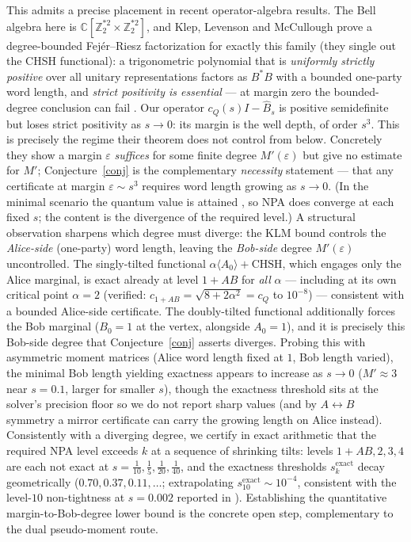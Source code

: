 \documentclass[11pt]{article}
\begin{document}
This admits a precise placement in recent operator-algebra results. The Bell
algebra here is $\mathbb C[\mathbb Z_2^{*2}\times\mathbb Z_2^{*2}]$, and
Klep, Levenson and McCullough \cite{KLM} prove a degree-bounded
Fej\'er--Riesz factorization for exactly this family (they single out the CHSH
functional): a trigonometric polynomial that is \emph{uniformly strictly
positive} over all unitary representations factors as $B^*B$ with a bounded
one-party word length, and \emph{strict positivity is essential} --- at margin
zero the bounded-degree conclusion can fail \cite{KLM,FKMPRSZ}. Our operator $c_Q(s)I-\widehat B_s$ is positive semidefinite
but loses strict positivity as $s\to0$: its margin is the well depth, of order
$s^3$. This is precisely the regime their theorem does not control from below.
Concretely they show a margin $\varepsilon$ \emph{suffices} for some finite
degree $M'(\varepsilon)$ but give no estimate for $M'$; Conjecture~\ref{conj} is
the complementary \emph{necessity} statement --- that any certificate at margin
$\varepsilon\sim s^3$ requires word length growing as $s\to0$. (In the minimal
scenario the quantum value is attained \cite{BB}, so
NPA does converge at each fixed $s$; the content is the divergence of the
required level.) A structural observation sharpens which degree must diverge:
the KLM bound controls the \emph{Alice-side} (one-party) word length, leaving the
\emph{Bob-side} degree $M'(\varepsilon)$ uncontrolled. The singly-tilted
functional $\alpha\langle A_0\rangle+\mathrm{CHSH}$, which engages only the Alice
marginal, is exact already at level $1{+}AB$ for \emph{all} $\alpha$ --- including
at its own critical point $\alpha=2$ (verified: $c_{1+AB}=\sqrt{8+2\alpha^2}=c_Q$
to $10^{-8}$) --- consistent with a bounded Alice-side certificate. The
doubly-tilted functional additionally forces the Bob marginal ($B_0=1$ at the
vertex, alongside $A_0=1$), and it is precisely this Bob-side degree that
Conjecture~\ref{conj} asserts diverges. Probing this with asymmetric moment
matrices (Alice word length fixed at $1$, Bob length varied), the minimal Bob
length yielding exactness appears to increase as $s\to0$ ($M'\approx3$ near
$s=0.1$, larger for smaller $s$), though the exactness threshold sits at the
solver's precision floor so we do not report sharp values (and by
$A\!\leftrightarrow\!B$ symmetry a mirror certificate can carry the growing length
on Alice instead). Consistently with a diverging degree, we
certify in exact arithmetic that the required NPA level exceeds $k$ at a sequence
of shrinking tilts: levels $1{+}AB,2,3,4$ are each not exact at
$s=\tfrac1{10},\tfrac15,\tfrac1{20},\tfrac1{40}$, and the exactness thresholds
$s^{\mathrm{exact}}_k$ decay geometrically ($0.70,0.37,0.11,\ldots$;
extrapolating
$s^{\mathrm{exact}}_{10}\!\sim\!10^{-4}$, consistent with the level-$10$ non-tightness at
$s=0.002$ reported in \cite{Gigena}). Establishing the quantitative
margin-to-Bob-degree lower bound is the concrete open step, complementary to the
dual pseudo-moment route.
\end{document}
